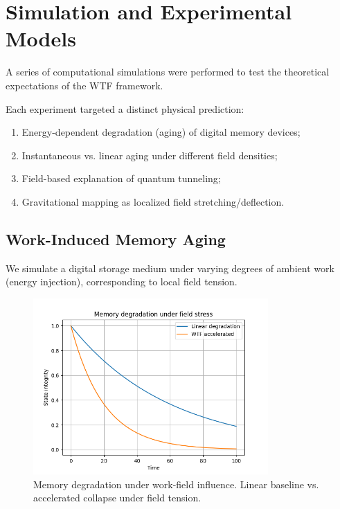 \section{Simulation and Experimental Models}

A series of computational simulations were performed to test the theoretical expectations of the WTF framework.

Each experiment targeted a distinct physical prediction:
\begin{enumerate}
    \item Energy-dependent degradation (aging) of digital memory devices;
    \item Instantaneous vs. linear aging under different field densities;
    \item Field-based explanation of quantum tunneling;
    \item Gravitational mapping as localized field stretching/deflection.
\end{enumerate}

\vspace{10pt}

\subsection{Work-Induced Memory Aging}

We simulate a digital storage medium under varying degrees of ambient work (energy injection), corresponding to local field tension.

\begin{figure}[h!]
    \centering
    \includegraphics[width=0.8\textwidth]{figures/Figure_1.png}
    \caption{Memory degradation under work-field influence. Linear baseline vs. accelerated collapse under field tension.}
\end{figure}

